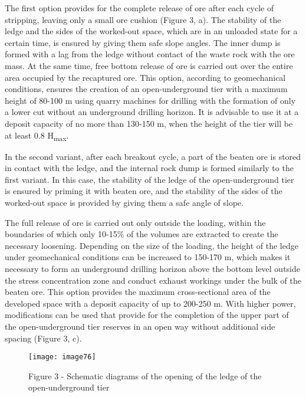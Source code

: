 \begin{multicols}{2}
The first option provides for the complete release of ore after each
cycle of stripping, leaving only a small ore cushion (Figure 3, a). The
stability of the ledge and the sides of the worked-out space, which are
in an unloaded state for a certain time, is ensured by giving them safe
slope angles. The inner dump is formed with a lag from the ledge without
contact of the waste rock with the ore mass. At the same time, free
bottom release of ore is carried out over the entire area occupied by
the recaptured ore. This option, according to geomechanical conditions,
ensures the creation of an open-underground tier with a maximum height
of 80-100 m using quarry machines for drilling with the formation of
only a lower cut without an underground drilling horizon. It is
advisable to use it at a deposit capacity of no more than 130-150 m,
when the height of the tier will be at least 0.8 H\textsubscript{max}.

In the second variant, after each breakout cycle, a part of the beaten
ore is stored in contact with the ledge, and the internal rock dump is
formed similarly to the first variant. In this case, the stability of
the ledge of the open-underground tier is ensured by priming it with
beaten ore, and the stability of the sides of the worked-out space is
provided by giving them a safe angle of slope.

The full release of ore is carried out only outside the loading, within
the boundaries of which only 10-15\% of the volumes are extracted to
create the necessary loosening. Depending on the size of the loading,
the height of the ledge under geomechanical conditions can be increased
to 150-170 m, which makes it necessary to form an underground drilling
horizon above the bottom level outside the stress concentration zone and
conduct exhaust workings under the bulk of the beaten ore. This option
provides the maximum cross-sectional area of the developed space with a
deposit capacity of up to 200-250 m. With higher power, modifications
can be used that provide for the completion of the upper part of the
open-underground tier reserves in an open way without additional side
spacing (Figure 3, c).
\end{multicols}

\begin{figure}[H]
    \centering
    \texttt{[image: image76]}
    \caption*{Figure 3 - Schematic diagrams of the opening of the ledge of the
open-underground tier}
\end{figure}

